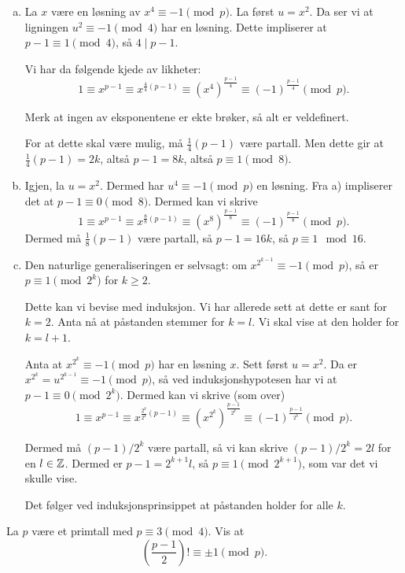 \documentclass[11pt, norsk]{article}
\begin{document}
\begin{enumerate}[a)]
\item La $x$ være en løsning av $x^4 \equiv -1 \pmod p$. La først $u=x^2$. Da ser vi at ligningen $u^2 \equiv -1 \pmod 4$ har en løsning. Dette impliserer at $p -1 \equiv 1 \pmod 4$, så $4 \mid p-1$. 

Vi har da følgende kjede av likheter:
$$
1 \equiv x^{p-1} \equiv x^{\frac 44 (p-1)} \equiv (x^4)^{\frac{p-1}{4}} \equiv (-1)^{\frac{p-1}{4}} \pmod p.
$$

Merk at ingen av eksponentene er ekte brøker, så alt er veldefinert.

For at dette skal være mulig, må $\frac 14 (p-1)$ være partall. Men dette gir at $\frac 14 (p-1)=2k$, altså $p-1 = 8k$, altså $p \equiv 1 \pmod 8$.

\item Igjen, la $u=x^2$. Dermed har $u^4 \equiv -1 \pmod p$ en løsning. Fra a) impliserer det at $p-1 \equiv 0 \pmod 8$. Dermed kan vi skrive
$$
1 \equiv x^{p-1} \equiv x^{\frac 88 (p-1)} \equiv (x^8)^{\frac{p-1}{8}} \equiv (-1)^{\frac{p-1}{8}} \pmod p.
$$
Dermed må $\frac 18 (p-1)$ være partall, så $p-1 = 16k$, så $p \equiv 1 \mod {16}$. 
\item Den naturlige generaliseringen er selvsagt: om $x^{2^{k-1}} \equiv -1 \pmod p$, så er $p \equiv 1 \pmod {2^k}$ for $k \geq 2$. 

Dette kan vi bevise med induksjon. Vi har allerede sett at dette er sant for $k=2$. Anta nå at påstanden stemmer for $k=l$. Vi skal vise at den holder for $k=l+1$.

Anta at $x^{2^k} \equiv -1 \pmod p$ har en løsning $x$. Sett først $u=x^2$. Da er $x^{2^{k}}=u^{2^{k-1}} \equiv -1 \pmod p$, så ved induksjonshypotesen har vi at $p-1 \equiv 0 \pmod {2^k}$. Dermed kan vi skrive (som over)
$$
1 \equiv x^{p-1} \equiv x^{\frac{2^k}{2^k}(p-1)} \equiv {(x^{2^k})}^{\frac{p-1}{2^k}} \equiv (-1)^{\frac{p-1}{2^k}} \pmod {p}.
$$

Dermed må $(p-1)/2^k$ være partall, så vi kan skrive $(p-1)/2^k = 2l$ for en $l \in \mathbb{Z}$. Dermed er $p-1 = 2^{k+1}l$, så $p \equiv 1 \pmod {2^{k+1}}$, som var det vi skulle vise.

Det følger ved induksjonsprinsippet at påstanden holder for alle $k$.
\end{enumerate}

\begin{oppg}[Oppgave 5.8]
La $p$ være et primtall med $p \equiv 3 \pmod 4$. Vis at
$$
\left( \frac{p-1}{2} \right)! \equiv \pm 1 \pmod p.
$$
\end{oppg}
\end{document}
